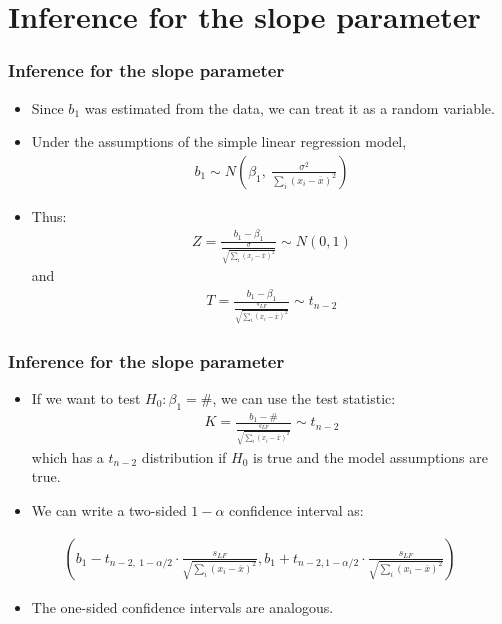 \documentclass[handout]{beamer}\usepackage{graphicx, color}
\providecommand{\ov}[1]{\overline{#1}}
\numberwithin{equation}{section}
\begin{document}
\section{Inference for the slope parameter}

\begin{frame}
\frametitle{Inference for the slope parameter}
\begin{itemize}
\item Since $b_1$ was estimated from the data, we can treat it as a random variable.
\pause \item Under the assumptions of the simple linear regression model,
\begin{align*}
b_1 \sim N \left ( \beta_1, \ \frac{\sigma^2}{\sum_i(x_i -\ov{x})^2} \right )
\end{align*}
\pause \item Thus:
\begin{align*}
Z = \frac{b_1 - \beta_1}{\frac{\sigma}{\sqrt{ \sum_i(x_i -\ov{x})^2} }} \sim N(0,1)
\end{align*}
\pause and 
\begin{align*}
T =  \frac{b_1 - \beta_1}{\frac{s_{LF}}{\sqrt{ \sum_i(x_i -\ov{x})^2} }} \sim t_{n-2}
\end{align*}
\end{itemize}
\end{frame}

\begin{frame}
\frametitle{Inference for the slope parameter} \small
\begin{itemize}
\item If we want to test $H_0: \beta_1 = \#$, we can use the test statistic:
\begin{align*}
K = \frac{b_1 - \#}{\frac{s_{LF}}{\sqrt{ \sum_i(x_i -\ov{x})^2} }} \sim t_{n-2}
\end{align*}
\pause which has a $t_{n-2}$ distribution if $H_0$ is true and the model assumptions are true.
\pause \item We can write a two-sided $1 - \alpha$ confidence interval as:
\end{itemize}
\pause \begin{align*}
\left( b_1 - t_{n-2, \ 1 - \alpha/2} \cdot \frac{s_{LF}}{\sqrt{ \sum_i(x_i -\ov{x})^2} }, b_1 + t_{n - 2, 1 - \alpha/2} \cdot \frac{s_{LF}}{\sqrt{ \sum_i(x_i -\ov{x})^2} } \right)
\end{align*}
\begin{itemize}
\pause \item The one-sided confidence intervals are analogous.
\end{itemize}
\end{frame}
\end{document}
